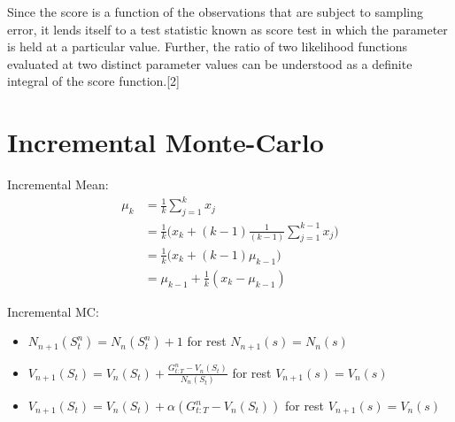\begin{appendices}
Since the score is a function of the observations that are subject to sampling error, it lends itself to a test statistic known as score test in which the parameter is held at a particular value. Further, the ratio of two likelihood functions evaluated at two distinct parameter values can be understood as a definite integral of the score function.[2]

\section{Incremental Monte-Carlo}
Incremental Mean:
\begin{align}
	\mu_k &= \frac{1}{k}\sum_{j=1}^k x_j\\
	&= \frac{1}{k}\Big(x_k+(k-1)\frac{1}{(k-1)}\sum_{j=1}^{k-1} x_j\Big)\\
	&= \frac{1}{k}\Big(x_k+(k-1)\mu_{k-1}\Big)\\
	&= \mu_{k-1}+\frac{1}{k}(x_k-\mu_{k-1})
	\label{eq:incremental_mean}
\end{align}

Incremental MC:
\begin{itemize}
	\item $N_{n+1}(S_t^n) = N_{n}(S_t^n) + 1$ for rest $N_{n+1}(s) = N_{n}(s)$
	\item $V_{n+1}(S_t) = V_{n}(S_t)+\frac{G_{t:T}^n -V_n(S_t)}{N_n(S_t)}$ for rest $V_{n+1}(s)= V_n(s)$ 
	\item $V_{n+1}(S_t) = V_{n}(S_t)+\alpha({G_{t:T}^n -V_n(S_t)})$ for rest $V_{n+1}(s)= V_n(s)$ 
\end{itemize}

\end{appendices}

